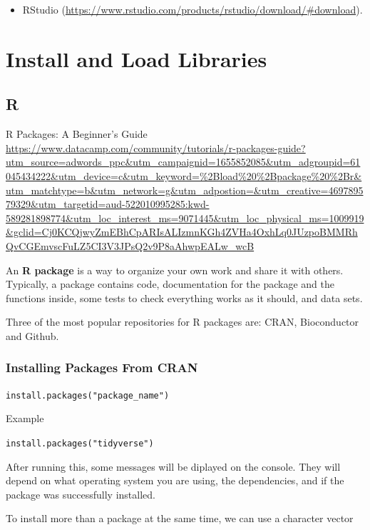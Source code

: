 \documentclass[]{book}
\providecommand{\tightlist}{%
  \setlength{\itemsep}{0pt}\setlength{\parskip}{0pt}}
\begin{document}
\begin{itemize}
\tightlist
\item
  RStudio (\url{https://www.rstudio.com/products/rstudio/download/\#download}).
\end{itemize}

\hypertarget{install-and-load-libraries}{%
\section{Install and Load Libraries}\label{install-and-load-libraries}}

\hypertarget{r-4}{%
\subsection{R}\label{r-4}}

R Packages: A Beginner's Guide \url{https://www.datacamp.com/community/tutorials/r-packages-guide?utm_source=adwords_ppc\&utm_campaignid=1655852085\&utm_adgroupid=61045434222\&utm_device=c\&utm_keyword=\%2Bload\%20\%2Bpackage\%20\%2Br\&utm_matchtype=b\&utm_network=g\&utm_adpostion=\&utm_creative=469789579329\&utm_targetid=aud-522010995285:kwd-589281898774\&utm_loc_interest_ms=9071445\&utm_loc_physical_ms=1009919\&gclid=Cj0KCQjwyZmEBhCpARIsALIzmnKGh4ZVHa4OxhLq0JUzpoBMMRhQvCGEmvscFuLZ5CI3V3JPsQ2v9P8aAhwpEALw_wcB}

An \textbf{R package} is a way to organize your own work and share it with others. Typically, a package contains code, documentation for the package and the functions inside, some tests to check everything works as it should, and data sets.

Three of the most popular repositories for R packages are: CRAN, Bioconductor and Github.

\hypertarget{installing-packages-from-cran}{%
\subsubsection{Installing Packages From CRAN}\label{installing-packages-from-cran}}

\texttt{install.packages("package\_name")}

Example

\texttt{install.packages("tidyverse")}

After running this, some messages will be diplayed on the console. They will depend on what operating system you are using, the dependencies, and if the package was successfully installed.

To install more than a package at the same time, we can use a character vector
\end{document}
